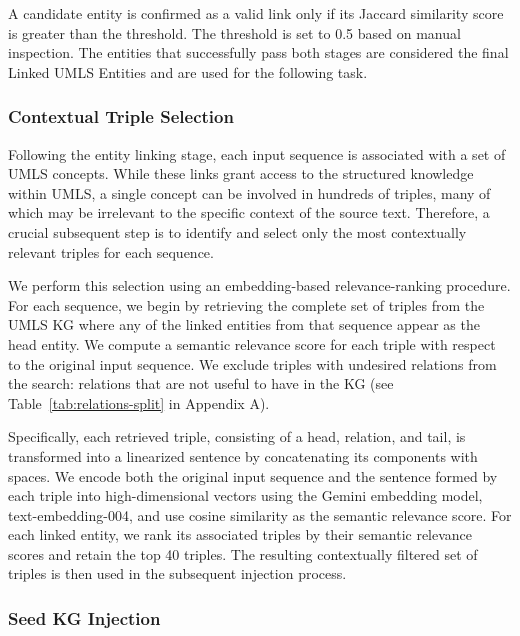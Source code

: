 \documentclass[10pt]{article}
\begin{document}
A candidate entity is confirmed as a valid link only if its Jaccard similarity score is greater than the threshold. The threshold is set to 0.5 based on manual inspection. The entities that successfully pass both stages are considered the final Linked UMLS Entities and are used for the following task.

\subsubsection{Contextual Triple Selection}
\label{subsubsec:contextual_triple_selection}

Following the entity linking stage, each input sequence is associated with a set of UMLS concepts. While these links grant access to the structured knowledge within UMLS, a single concept can be involved in hundreds of triples, many of which may be irrelevant to the specific context of the source text. Therefore, a crucial subsequent step is to identify and select only the most contextually relevant triples for each sequence.

We perform this selection using an embedding-based relevance-ranking procedure. For each sequence, we begin by retrieving the complete set of triples from the UMLS KG where any of the linked entities from that sequence appear as the head entity. We compute a semantic relevance score for each triple with respect to the original input sequence. We exclude triples with undesired relations from the search: relations that are not useful to have in the KG (see Table~\ref{tab:relations-split} in Appendix A).

Specifically, each retrieved triple, consisting of a head, relation, and tail, is transformed into a linearized sentence by concatenating its components with spaces. We encode both the original input sequence and the sentence formed by each triple into high-dimensional vectors using the Gemini embedding model, text-embedding-004, and use cosine similarity as the semantic relevance score. For each linked entity, we rank its associated triples by their semantic relevance scores and retain the top 40 triples. The resulting contextually filtered set of triples is then used in the subsequent injection process.


\subsubsection{Seed KG Injection}
\label{subsubsec_kg_injection}
\end{document}
